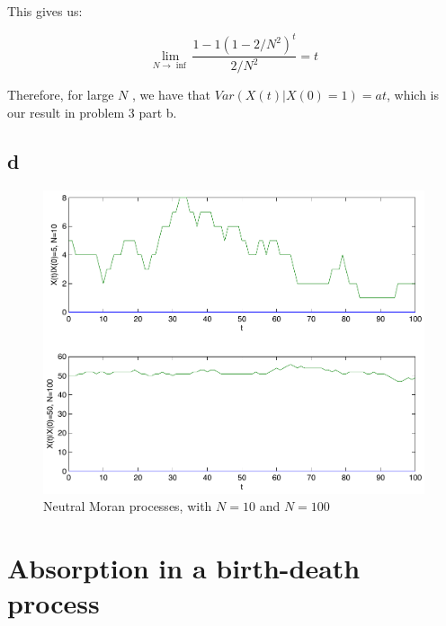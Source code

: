 This gives us:

\[ \boxed{ \lim\limits_{N\rightarrow\inf} \frac{1 - 1(1-2/N^2)^t}{2/N^2} = t } \]

Therefore, for large $N$ , we have that $Var(X(t) | X(0) = 1) = at$, which is our result in problem 3 part b.


\subsection{d}

\begin{figure}[htbp]
\centering
\includegraphics[scale=0.7]{./images/plot_moran}
\caption{Neutral Moran processes, with $N=10$ and $N=100$}
\label{fig:graph03}
\end{figure}




\setcounter{chapter}{5}
\setcounter{section}{0}
\section{Absorption in a birth-death process}
